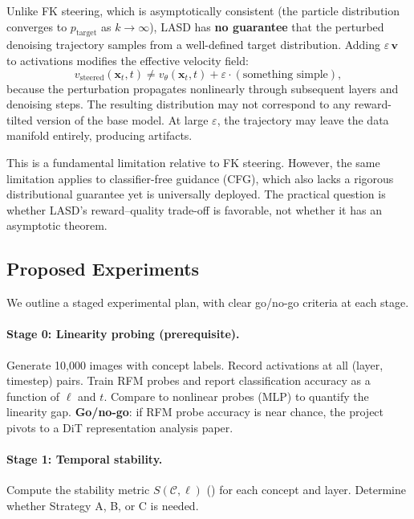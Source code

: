 \documentclass[11pt]{article}
\begin{document}
Unlike FK steering, which is asymptotically consistent (the particle distribution converges to $p_{\mathrm{target}}$ as $k \to \infty$), LASD has \textbf{no guarantee} that the perturbed denoising trajectory samples from a well-defined target distribution.
Adding $\varepsilon\,\mathbf{v}$ to activations modifies the effective velocity field:
\begin{equation}
    v_{\mathrm{steered}}(\mathbf{x}_t, t) \neq v_\theta(\mathbf{x}_t, t) + \varepsilon \cdot (\text{something simple}),
\end{equation}
because the perturbation propagates nonlinearly through subsequent layers and denoising steps.
The resulting distribution may not correspond to any reward-tilted version of the base model.
At large $\varepsilon$, the trajectory may leave the data manifold entirely, producing artifacts.

This is a fundamental limitation relative to FK steering.
However, the same limitation applies to classifier-free guidance (CFG), which also lacks a rigorous distributional guarantee yet is universally deployed.
The practical question is whether LASD's reward--quality trade-off is favorable, not whether it has an asymptotic theorem.

\subsection{Proposed Experiments}

We outline a staged experimental plan, with clear go/no-go criteria at each stage.

\paragraph{Stage 0: Linearity probing (prerequisite).}
Generate 10,000 images with concept labels.
Record activations at all (layer, timestep) pairs.
Train RFM probes and report classification accuracy as a function of $\ell$ and $t$.
Compare to nonlinear probes (MLP) to quantify the linearity gap.
\textbf{Go/no-go}: if RFM probe accuracy is near chance, the project pivots to a DiT representation analysis paper.

\paragraph{Stage 1: Temporal stability.}
Compute the stability metric $S(\mathcal{C}, \ell)$ () for each concept and layer.
Determine whether Strategy A, B, or C is needed.
\end{document}

